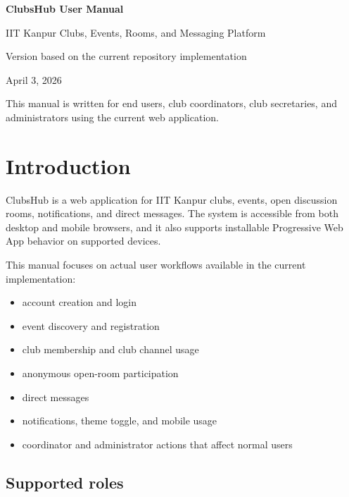 \documentclass[11pt,a4paper]{article}
\newcommand{\productname}{ClubsHub}
\newcommand{\manualdate}{April 3, 2026}
\begin{document}
\begin{titlepage}
  \centering
  \vspace*{2cm}
  {\Huge \bfseries ClubsHub User Manual\par}
  \vspace{0.75cm}
  {\Large IIT Kanpur Clubs, Events, Rooms, and Messaging Platform\par}
  \vspace{1.5cm}
  {\large Version based on the current repository implementation\par}
  \vspace{0.25cm}
  {\large \manualdate\par}
  \vfill
  \begin{minipage}{0.82\textwidth}
    \centering
    This manual is written for end users, club coordinators, club secretaries, and administrators using the current web application.
  \end{minipage}
\end{titlepage}

\tableofcontents
\clearpage

\section{Introduction}

\productname{} is a web application for IIT Kanpur clubs, events, open discussion rooms, notifications, and direct messages. The system is accessible from both desktop and mobile browsers, and it also supports installable Progressive Web App behavior on supported devices.

This manual focuses on actual user workflows available in the current implementation:

\begin{itemize}[leftmargin=1.5em]
  \item account creation and login
  \item event discovery and registration
  \item club membership and club channel usage
  \item anonymous open-room participation
  \item direct messages
  \item notifications, theme toggle, and mobile usage
  \item coordinator and administrator actions that affect normal users
\end{itemize}

\subsection{Supported roles}
\end{document}
